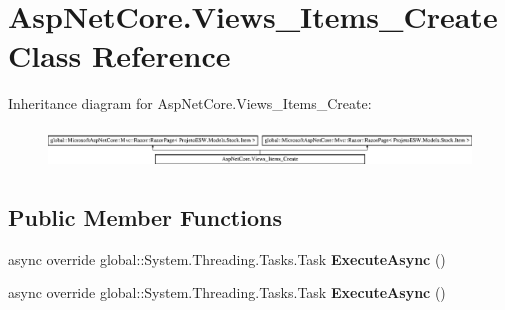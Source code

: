 \hypertarget{class_asp_net_core_1_1_views___items___create}{}\section{Asp\+Net\+Core.\+Views\+\_\+\+Items\+\_\+\+Create Class Reference}
\label{class_asp_net_core_1_1_views___items___create}
Inheritance diagram for Asp\+Net\+Core.\+Views\+\_\+\+Items\+\_\+\+Create\+:\begin{figure}[H]
\begin{center}
\leavevmode
\includegraphics[height=1.083172cm]{class_asp_net_core_1_1_views___items___create}
\end{center}
\end{figure}
\subsection*{Public Member Functions}
\begin{DoxyCompactItemize}
\item 
\mbox{\label{class_asp_net_core_1_1_views___items___create_adbf2528e48677b912529b361160d0ded}} 
async override global\+::\+System.\+Threading.\+Tasks.\+Task {\bfseries Execute\+Async} ()
\item 
\mbox{\label{class_asp_net_core_1_1_views___items___create_adbf2528e48677b912529b361160d0ded}} 
async override global\+::\+System.\+Threading.\+Tasks.\+Task {\bfseries Execute\+Async} ()
\end{DoxyCompactItemize}
